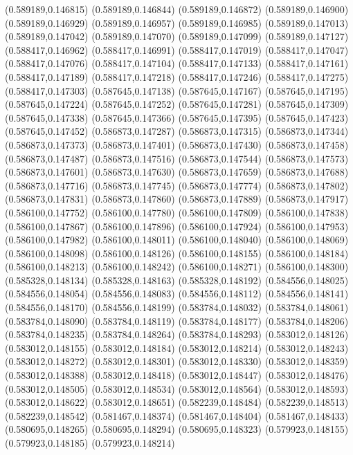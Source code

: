 (0.589189,0.146815)
(0.589189,0.146844)
(0.589189,0.146872)
(0.589189,0.146900)
(0.589189,0.146929)
(0.589189,0.146957)
(0.589189,0.146985)
(0.589189,0.147013)
(0.589189,0.147042)
(0.589189,0.147070)
(0.589189,0.147099)
(0.589189,0.147127)
(0.588417,0.146962)
(0.588417,0.146991)
(0.588417,0.147019)
(0.588417,0.147047)
(0.588417,0.147076)
(0.588417,0.147104)
(0.588417,0.147133)
(0.588417,0.147161)
(0.588417,0.147189)
(0.588417,0.147218)
(0.588417,0.147246)
(0.588417,0.147275)
(0.588417,0.147303)
(0.587645,0.147138)
(0.587645,0.147167)
(0.587645,0.147195)
(0.587645,0.147224)
(0.587645,0.147252)
(0.587645,0.147281)
(0.587645,0.147309)
(0.587645,0.147338)
(0.587645,0.147366)
(0.587645,0.147395)
(0.587645,0.147423)
(0.587645,0.147452)
(0.586873,0.147287)
(0.586873,0.147315)
(0.586873,0.147344)
(0.586873,0.147373)
(0.586873,0.147401)
(0.586873,0.147430)
(0.586873,0.147458)
(0.586873,0.147487)
(0.586873,0.147516)
(0.586873,0.147544)
(0.586873,0.147573)
(0.586873,0.147601)
(0.586873,0.147630)
(0.586873,0.147659)
(0.586873,0.147688)
(0.586873,0.147716)
(0.586873,0.147745)
(0.586873,0.147774)
(0.586873,0.147802)
(0.586873,0.147831)
(0.586873,0.147860)
(0.586873,0.147889)
(0.586873,0.147917)
(0.586100,0.147752)
(0.586100,0.147780)
(0.586100,0.147809)
(0.586100,0.147838)
(0.586100,0.147867)
(0.586100,0.147896)
(0.586100,0.147924)
(0.586100,0.147953)
(0.586100,0.147982)
(0.586100,0.148011)
(0.586100,0.148040)
(0.586100,0.148069)
(0.586100,0.148098)
(0.586100,0.148126)
(0.586100,0.148155)
(0.586100,0.148184)
(0.586100,0.148213)
(0.586100,0.148242)
(0.586100,0.148271)
(0.586100,0.148300)
(0.585328,0.148134)
(0.585328,0.148163)
(0.585328,0.148192)
(0.584556,0.148025)
(0.584556,0.148054)
(0.584556,0.148083)
(0.584556,0.148112)
(0.584556,0.148141)
(0.584556,0.148170)
(0.584556,0.148199)
(0.583784,0.148032)
(0.583784,0.148061)
(0.583784,0.148090)
(0.583784,0.148119)
(0.583784,0.148177)
(0.583784,0.148206)
(0.583784,0.148235)
(0.583784,0.148264)
(0.583784,0.148293)
(0.583012,0.148126)
(0.583012,0.148155)
(0.583012,0.148184)
(0.583012,0.148214)
(0.583012,0.148243)
(0.583012,0.148272)
(0.583012,0.148301)
(0.583012,0.148330)
(0.583012,0.148359)
(0.583012,0.148388)
(0.583012,0.148418)
(0.583012,0.148447)
(0.583012,0.148476)
(0.583012,0.148505)
(0.583012,0.148534)
(0.583012,0.148564)
(0.583012,0.148593)
(0.583012,0.148622)
(0.583012,0.148651)
(0.582239,0.148484)
(0.582239,0.148513)
(0.582239,0.148542)
(0.581467,0.148374)
(0.581467,0.148404)
(0.581467,0.148433)
(0.580695,0.148265)
(0.580695,0.148294)
(0.580695,0.148323)
(0.579923,0.148155)
(0.579923,0.148185)
(0.579923,0.148214)
